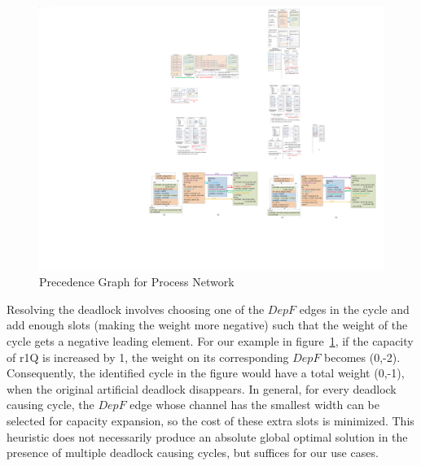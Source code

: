 \documentclass{sig-alternate}
\begin{document}
\begin{figure}[htp]
\begin{center}
\includegraphics[width=0.8\linewidth]{fig/predGraphNew.pdf}
\caption{Precedence Graph for Process Network
\label{fig:predgraph}}
\end{center}
\vspace{-2.0em}
\end{figure}

Resolving
the deadlock involves choosing one of the $DepF$ edges
in the cycle and add enough slots (making the weight more negative)
such that the weight of the cycle gets a negative leading element. For our example in figure~\ref{fig:predgraph}, if the capacity of r1Q
is increased by 1, the weight on its corresponding $DepF$ becomes (0,-2). Consequently, the identified cycle in the figure would have
a total weight (0,-1), when the original artificial deadlock disappears.
In general, for every deadlock causing cycle, the $DepF$ edge whose channel has the smallest width can be selected for capacity expansion, so the cost of these extra slots is minimized. This heuristic does not necessarily produce an absolute
global optimal solution in the presence of multiple deadlock causing cycles, but suffices for our use cases.

\end{document}
